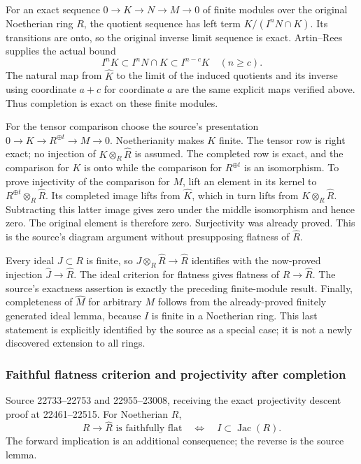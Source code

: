 For an exact sequence \(0\to K\to N\to M\to0\) of finite modules over the original Noetherian ring \(R\), the quotient sequence has left term \(K/(I^nN\cap K)\). Its transitions are onto, so the original inverse limit sequence is exact. Artin--Rees supplies the actual bound \[
I^nK\subset I^nN\cap K\subset I^{n-c}K\quad(n\geq c).
\] The natural map from \(\widehat K\) to the limit of the induced quotients and its inverse using coordinate \(a+c\) for coordinate \(a\) are the same explicit maps verified above. Thus completion is exact on these finite modules.

For the tensor comparison choose the source's presentation \(0\to K\to R^{\oplus t}\to M\to0\). Noetherianity makes \(K\) finite. The tensor row is right exact; no injection of \(K\otimes_R\widehat R\) is assumed. The completed row is exact, and the comparison for \(K\) is onto while the comparison for \(R^{\oplus t}\) is an isomorphism. To prove injectivity of the comparison for \(M\), lift an element in its kernel to \(R^{\oplus t}\otimes_R\widehat R\). Its completed image lifts from \(\widehat K\), which in turn lifts from \(K\otimes_R\widehat R\). Subtracting this latter image gives zero under the middle isomorphism and hence zero. The original element is therefore zero. Surjectivity was already proved. This is the source's diagram argument without presupposing flatness of \(\widehat R\).

Every ideal \(J\subset R\) is finite, so \(J\otimes_R\widehat R\to\widehat R\) identifies with the now-proved injection \(\widehat J\to\widehat R\). The ideal criterion for flatness gives flatness of \(R\to\widehat R\). The source's exactness assertion is exactly the preceding finite-module result. Finally, completeness of \(\widehat M\) for arbitrary \(M\) follows from the already-proved finitely generated ideal lemma, because \(I\) is finite in a Noetherian ring. This last statement is explicitly identified by the source as a special case; it is not a newly discovered extension to all rings.

\subsubsection{Faithful flatness criterion and projectivity after completion}\label{algebra-proof-014-faithful-flatness-criterion-and-projectivity-after-completion}

Source 22733--22753 and 22955--23008, receiving the exact projectivity descent proof at 22461--22515. For Noetherian \(R\), \[
R\longrightarrow\widehat R\text{ is faithfully flat}
\quad\Longleftrightarrow\quad I\subset\operatorname{Jac}(R).
\] The forward implication is an additional consequence; the reverse is the source lemma.

